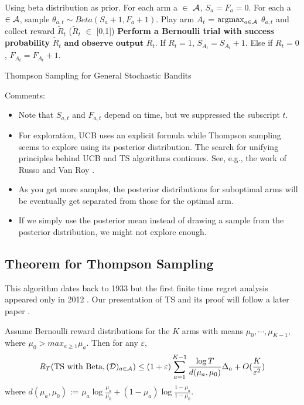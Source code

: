 \documentclass[11pt]{article}
\begin{document}
\begin{algorithm}
	\begin{algorithmic}[1]
		\STATE Using beta distribution as prior.
		\STATE For each arm a $\in$ $\mathcal{A}$, $S_{a}=F_{a}=0$.
		\STATE For each a$\in\mathcal{A}$, sample $\theta_{a,t} \sim Beta(S_{a}+1,F_{a}+1)$.
		\STATE Play arm $A_t$ = $\operatorname*{argmax}_{a\in \mathcal{A}}$ $\theta_{a,t}$ and collect reward $\tilde{R}_t$ ($\tilde{R}_t$ $\in$ [0,1])
		\STATE \textbf{Perform a Bernoulli trial with success probability} $\tilde{R}_t$ $\textbf{and observe output}$ $R_t$.
		\STATE If $R_t=1$, $S_{A_t}=S_{A_t}+1$. Else if $R_t=0$, $F_{A_t}=F_{A_t}+1$.
		\ENDFOR 
	\end{algorithmic}
	\caption{Thompson Sampling for General Stochastic Bandits}
\end{algorithm}
Comments:
\begin{itemize}
	\item Note that $S_{a,t}$ and $F_{a,t}$ depend on time, but we
          suppressed the subscript $t$.
	\item For exploration, UCB  uses an explicit formula while
          Thompson sampling seems to explore using its posterior
          distribution. The search for unifying principles behind UCB
          and TS algorithms continues. See, e.g., the work of Russo
          and Van Roy \cite{russo2014learning}. 
        \item As you
          get more samples, the posterior distributions for suboptimal arms will be eventually get separated from those for the optimal arm.
	\item If we simply use the posterior mean instead of drawing a
          sample from the posterior distribution, we might not explore
          enough. 
\end{itemize}

\subsection{Theorem for Thompson Sampling}
This algorithm dates back to 1933 \cite{thompson1933likelihood} but the first finite time regret analysis appeared only in 2012 \cite{agrawal2012analysis}. Our presentation of TS and its proof will follow a later paper \cite{agrawal2013further}.
\begin{theorem}
Assume Bernoulli reward distributions for the $K$ arms with means $\mu_0,\cdots,\mu_{K-1}$, where $\mu_0 > max_{a \geq 1}\mu_a$. Then for any $\varepsilon$,
	\begin{align*}
	R_T(\text{TS with Beta},(\mathcal{D})_{a\in\mathcal{A}} ) \leq (1+\varepsilon)\sum_{a=1}^{K-1}\frac{\log{T}}{d(\mu_a,\mu_0)}\Delta_a +O(\frac{K}{\varepsilon^2})
	\end{align*}
	where $d(\mu_a, \mu_0)$ := $\mu_a \log{\frac{\mu_a}{\mu_0}}+(1-\mu_a)\log{\frac{1-\mu_a}{1-\mu_0}}$.
\end{theorem}
\end{document}
